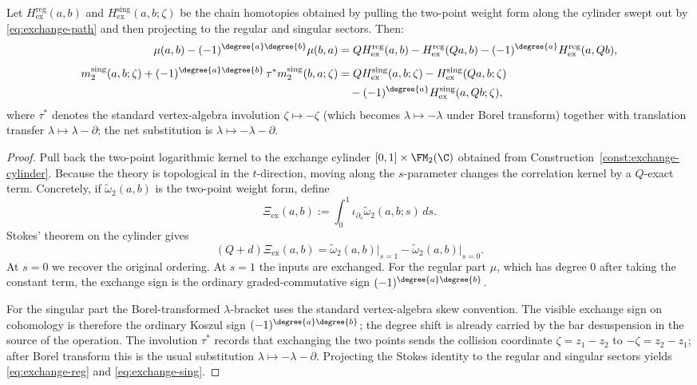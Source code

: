 \begin{lemma}
\label{lem:PVA2_proof}
Let $H^{\mathrm{reg}}_{\mathrm{ex}}(a,b)$ and
$H^{\mathrm{sing}}_{\mathrm{ex}}(a,b;\zeta)$ be the chain homotopies obtained by
pulling the two-point weight form along the cylinder swept out by
\eqref{eq:exchange-path} and then projecting to the regular and singular sectors.
Then:
\begin{align}
\label{eq:exchange-reg}
\mu(a,b)-(-1)^{\degree{a}\degree{b}}\mu(b,a)
&=
QH^{\mathrm{reg}}_{\mathrm{ex}}(a,b)
-H^{\mathrm{reg}}_{\mathrm{ex}}(Qa,b)
-(-1)^{\degree{a}}H^{\mathrm{reg}}_{\mathrm{ex}}(a,Qb),\\[4pt]
\label{eq:exchange-sing}
m_2^{\mathrm{sing}}(a,b;\zeta)
+(-1)^{\degree{a}\degree{b}}
\,\tau^\ast m_2^{\mathrm{sing}}(b,a;\zeta)
&=
QH^{\mathrm{sing}}_{\mathrm{ex}}(a,b;\zeta)
-H^{\mathrm{sing}}_{\mathrm{ex}}(Qa,b;\zeta) \notag\\
&\quad
-(-1)^{\degree{a}}H^{\mathrm{sing}}_{\mathrm{ex}}(a,Qb;\zeta),
\end{align}
where $\tau^\ast$ denotes the standard vertex-algebra involution
$\zeta\mapsto-\zeta$ (which becomes $\lambda\mapsto-\lambda$ under
Borel transform) together with translation transfer
$\lambda\mapsto\lambda-\partial$; the net substitution is
$\lambda\mapsto-\lambda-\partial$.
\end{lemma}

\begin{proof}
Pull back the two-point logarithmic kernel to the exchange cylinder
$[0,1]\times \FM_2(\C)$ obtained from Construction~\ref{const:exchange-cylinder}.
Because the theory is topological in the $t$-direction, moving along the $s$-parameter
changes the correlation kernel by a $Q$-exact term. Concretely, if
$\widetilde\omega_2(a,b)$ is the two-point weight form, define
\[
\Xi_{\mathrm{ex}}(a,b):=\int_0^1 \iota_{\partial_s}\widetilde\omega_2(a,b;s)\,ds.
\]
Stokes' theorem on the cylinder gives
\[
(Q+d)\Xi_{\mathrm{ex}}(a,b)
=
\widetilde\omega_2(a,b)\big|_{s=1}
-
\widetilde\omega_2(a,b)\big|_{s=0}.
\]
At $s=0$ we recover the original ordering. At $s=1$ the inputs are exchanged.
For the regular part $\mu$, which has degree $0$ after taking the constant term,
the exchange sign is the ordinary graded-commutative sign
$(-1)^{\degree{a}\degree{b}}$.

For the singular part the Borel-transformed $\lambda$-bracket uses
the standard vertex-algebra skew convention. The visible exchange
sign on cohomology is therefore the ordinary Koszul sign
$(-1)^{\degree{a}\degree{b}}$; the degree shift is already carried by
the bar desuspension in the source of the operation. The involution
$\tau^\ast$ records that exchanging the two points sends the collision coordinate
$\zeta=z_1-z_2$ to $-\zeta=z_2-z_1$; after Borel transform this is the usual
substitution $\lambda\mapsto-\lambda-\partial$.
Projecting the Stokes identity to the regular and singular sectors yields
\eqref{eq:exchange-reg} and \eqref{eq:exchange-sing}.
\end{proof}

